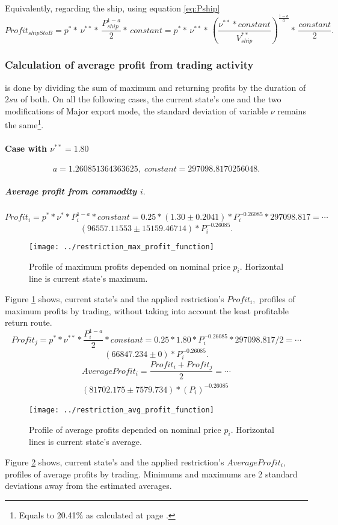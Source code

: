 \documentclass[]{article}
\begin{document}
 Equivalently, regarding the ship, using equation \eqref{eq:Pship}
 \[Profit_{shipStoB}=p^{*}*\,\nu^{**}*\,\frac{P^{1-a}_{ship}}{2}*\,constant=p^{*}*\,\nu^{**}*\,\left( \dfrac{\nu^{**}*constant}{V^{**}_{ship}}\right)^{\frac{1-a}{a}}*\, \dfrac{constant}{2}.\]
 \subsubsection{Calculation of average profit from trading activity} is done by dividing the sum of maximum and returning profits by the duration of $2su$ of both. On all the following cases, the current state's one and the two modifications of Major export mode, the standard deviation of variable $\nu$ remains the same\footnote{Equals to 20.41\% as calculated at page \pageref{MajorExportDeviation}.}.
\paragraph{Case with $\nu^{**}=1.80$}
\[a=1.260851364363625,\;constant=297098.8170256048.\]
\subparagraph{Average profit from commodity $i.$}
\[Profit_{i}=p^{*}*\nu^{*}*P^{1-a}_{i}*constant=0.25*(1.30\pm0.2041)*P_{i}^{-0.26085}*297098.817=\cdots\]
\[(96557.11553\pm15159.46714)*P_{i}^{-0.26085}.\]
 \begin{figure}[h]
	\centering
	\texttt{[image: ../restriction\_max\_profit\_function]}
	\caption{Profile of maximum profits depended on nominal price $p_{i}$. Horizontal line is current state's maximum.}
	\label{fig:restrictionmaxprofitfunction}
\end{figure}
Figure \ref{fig:restrictionmaxprofitfunction} shows,  current state's and the applied restriction's $Profit_{i},$  profiles of maximum profits by trading, without taking into account the least profitable return route. 
 \[Profit_{j}=p^{*}*\nu^{**}*\dfrac{P^{1-a}_{i}}{2}*constant=0.25*1.80*P_{i}^{-0.26085}*297098.817/2=\cdots\]
 \[(66847.234\pm0)*P_{i}^{-0.26085}.\]
\begin{equation}\label{eq:avgProfitCommodity}
	\begin{split}
	 AverageProfit_{i}=\dfrac{Profit_{i}+Profit_{j}}{2}=\cdots\\
 (81702.175\pm7579.734)*(P_{i})^{-0.26085}
 	\end{split}
\end{equation}
\begin{figure}[h]
	\centering
	\texttt{[image: ../restriction\_avg\_profit\_function]}
	\caption{Profile of average profits depended on nominal price $p_{i}$. Horizontal lines is current state's average.}
	\label{fig:restrictionavgprofitfunction}
\end{figure}
 Figure \ref{fig:restrictionavgprofitfunction} shows,  current state's and the  applied restriction's $AverageProfit_{i},$ profiles of average profits by trading. Minimums and maximums are 2 standard deviations away from the estimated averages.
 
\end{document}
